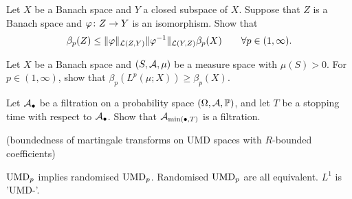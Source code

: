 \begin{exercise}\label{ex:UMD-isomorphism}
  Let $X$ be a Banach space and $Y$ a closed subspace of $X$.
  Suppose that $Z$ is a Banach space and $\varphi \colon Z \rightarrow Y$ is an isomorphism.
  Show that 
  \begin{equation*}
    \beta_{p}(Z) \leq \|\varphi\|_{\mathcal{L}(Z,Y)} \|\varphi^{-1}\|_{\mathcal{L}(Y,Z)} \beta_{p}(X) \qquad \forall p \in (1,\infty).
  \end{equation*}
\end{exercise}

\begin{exercise}\label{ex:UMD-Lp-reverse}
  Let $X$ be a Banach space and $(S,\mathcal{A},\mu)$ be a measure space with $\mu(S) > 0$.
  For $p \in (1,\infty)$, show that $\beta_{p}(L^p(\mu;X)) \geq \beta_{p}(X)$.
\end{exercise}

\begin{exercise}\label{ex:stopped-filtration}
  Let $\mathcal{A}_{\bullet}$ be a filtration on a probability space $(\Omega,\mathcal{A},\mathbb{P})$, and let $T$ be a stopping time with respect to $\mathcal{A}_{\bullet}$.
  Show that $\mathcal{A}_{\min(\bullet,T)}$ is a filtration.
\end{exercise}

\begin{exercise}
  (boundedness of martingale transforms on UMD spaces with $R$-bounded coefficients)
\end{exercise}

\begin{exercise}
  $\mathrm{UMD}_{p}$ implies randomised $\mathrm{UMD}_{p}$.
  Randomised $\mathrm{UMD}_{p}$ are all equivalent.
  $L^1$ is 'UMD-'.
\end{exercise}



